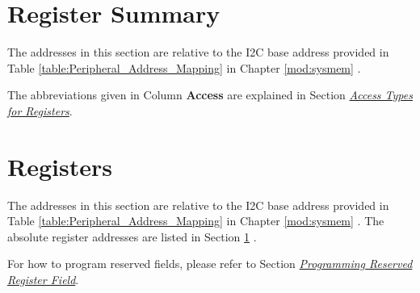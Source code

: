 \documentclass[main\_\_EN.tex]{subfiles}
\begin{document}
\section{Register Summary}\label{sec:i2c-reg-summ}

The addresses in this section are relative to the I2C base address provided in Table \ref{table:Peripheral_Address_Mapping} in Chapter \ref{mod:sysmem} \textit{}.

The abbreviations given in Column \textbf{Access} are explained in Section \hyperref[glossary-access-types]{\textit{Access Types for Registers}}.



{\clearpage}

\section{Registers}\label{5.5}

The addresses in this section are relative to the I2C base address provided in Table \ref{table:Peripheral_Address_Mapping} in Chapter \ref{mod:sysmem} \textit{}. The absolute register addresses are listed in Section \ref{sec:i2c-reg-summ} \textit{}. 

For how to program reserved fields, please refer to Section \hyperref[programming-reserved-field]{\textit{Programming Reserved Register Field}}.


\end{document}
